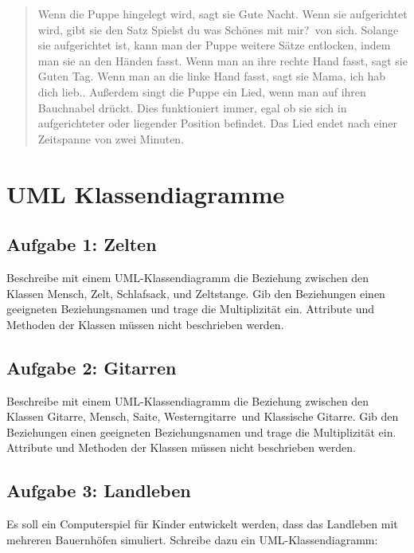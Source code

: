 \begin{quotation}
\noindent
Wenn die Puppe hingelegt wird, sagt sie \glqq Gute Nacht\grqq . Wenn sie
aufgerichtet wird, gibt sie den Satz \glqq Spielst du was Schönes mit mir?\grqq\
von sich. Solange sie aufgerichtet ist, kann man der Puppe weitere Sätze
entlocken, indem man sie an den Händen fasst. Wenn man an ihre rechte Hand
fasst, sagt sie \glqq Guten Tag\grqq . Wenn man an die linke Hand fasst, sagt
sie \glqq Mama, ich hab dich lieb.\grqq . Außerdem singt die Puppe ein Lied,
wenn man auf ihren Bauchnabel drückt. Dies funktioniert immer, egal ob sie sich
in aufgerichteter oder liegender Position befindet. Das Lied endet nach einer
Zeitspanne von zwei Minuten.
\end{quotation}


\section{UML Klassendiagramme}

\subsection{Aufgabe 1: Zelten}

Beschreibe mit einem UML-Klassendiagramm die Beziehung zwischen den Klassen
\glqq Mensch\grqq , \glqq Zelt\grqq , \glqq Schlafsack\grqq , und
\glqq Zeltstange\grqq . Gib den Beziehungen einen geeigneten Beziehungsnamen und
trage die Multiplizität ein. Attribute und Methoden der Klassen müssen nicht
beschrieben werden.

\subsection{Aufgabe 2: Gitarren}

Beschreibe mit einem UML-Klassendiagramm die Beziehung zwischen den Klassen
\glqq Gitarre\grqq , \glqq Mensch\grqq , \glqq Saite\grqq , \glqq
Westerngitarre\grqq\ und \glqq Klassische Gitarre\grqq . Gib den Beziehungen
einen geeigneten Beziehungsnamen und trage die Multiplizität ein. Attribute und
Methoden der Klassen müssen nicht beschrieben werden.

\subsection{Aufgabe 3: Landleben}

Es soll ein Computerspiel für Kinder entwickelt werden, dass das Landleben mit
mehreren Bauernhöfen simuliert. Schreibe dazu ein UML-Klassendiagramm:

